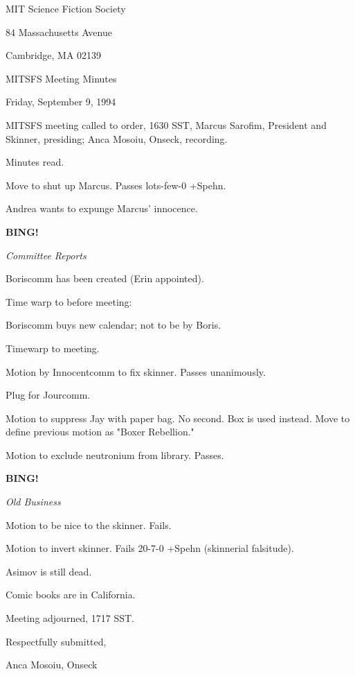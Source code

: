 \documentclass[12pt]{article}
\newcommand{\bing}{{\bf BING!} }
\newcommand{\goto}[1]{\bing \vskip 12pt \centerline{{\em{#1}}}}
\begin{document}
\begin{center}

MIT Science Fiction Society 

84 Massachusetts Avenue

Cambridge, MA 02139

\vspace{12pt}

MITSFS Meeting Minutes 

Friday, September 9, 1994

\end{center}
 
\vspace{18pt}

\setlength{\parskip}{6pt}

\noindent
MITSFS meeting called to order, 1630 SST,
Marcus Sarofim, President and Skinner, presiding; Anca Mosoiu, Onseck, recording.

Minutes read.

Move to shut up Marcus. Passes lots-few-0 +Spehn.

Andrea wants to expunge Marcus' innocence.

\goto{Committee Reports}

Boriscomm has been created (Erin appointed).

Time warp to before meeting:

Boriscomm buys new calendar; not to be by Boris.

Timewarp to meeting.

Motion by Innocentcomm to fix skinner. Passes unanimously.

Plug for Jourcomm.

Motion to suppress Jay with paper bag. No second. Box is used instead. Move to define previous motion as "Boxer Rebellion."

Motion to exclude neutronium from library. Passes.

\goto{Old Business}

Motion to be nice to the skinner. Fails.

Motion to invert skinner. Fails 20-7-0 +Spehn (skinnerial falsitude).

Asimov is still dead.

Comic books are in California.

\vspace{12pt}

\noindent
Meeting adjourned, 1717 SST.

\vspace{18pt}

\centerline{Respectfully submitted,}
\centerline{Anca Mosoiu, Onseck}
\end{document}
